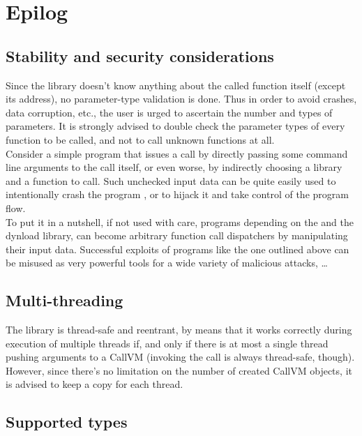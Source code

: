 \newpage

\section{Epilog}

\subsection{Stability and security considerations}

Since the  library doesn't know anything about the called function itself
(except its address), no parameter-type validation is done. Thus in order to avoid crashes, data corruption, etc., the user is urged to ascertain the number and types of parameters. 
It is strongly advised to double check the parameter types of every function to be called, and not to call unknown functions at all.\\

Consider a simple program that issues a call by directly passing some command line arguments to the call itself, or even worse, by indirectly choosing a library and a function to call. Such unchecked input data can be quite easily used to intentionally crash the program , or to hijack it and take control of the program flow.\\
To put it in a nutshell, if not used with care, programs depending on the 
and the dynload library, can become arbitrary function call dispatchers by
manipulating their input data. Successful exploits of programs like the one
outlined above can be misused as very powerful tools for a wide variety of
malicious attacks, \ldots
 

\subsection{Multi-threading}

The  library is thread-safe and reentrant, by means that it
works correctly during execution of multiple threads if, and only if there is
at most a single thread pushing arguments to a CallVM (invoking the call is
always thread-safe, though). However, since there's no limitation on the
number of created CallVM objects, it is advised to keep a copy for each
thread.


\subsection{Supported types}

